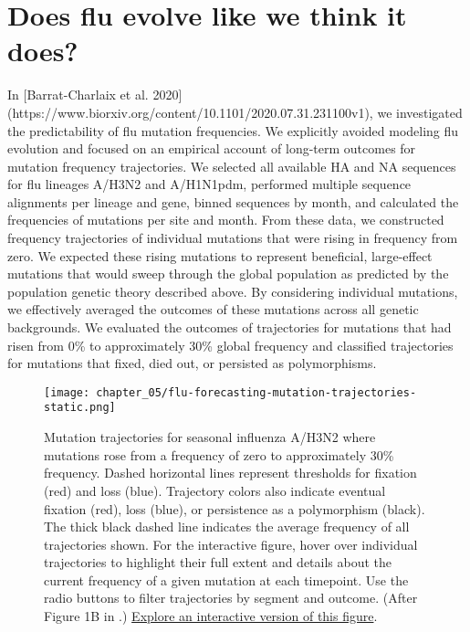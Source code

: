 \section{Does flu evolve like we think it does?}

In [Barrat-Charlaix et al. 2020](https://www.biorxiv.org/content/10.1101/2020.07.31.231100v1), we investigated the predictability of flu mutation frequencies.
We explicitly avoided modeling flu evolution and focused on an empirical account of long-term outcomes for mutation frequency trajectories.
We selected all available HA and NA sequences for flu lineages A/H3N2 and A/H1N1pdm, performed multiple sequence alignments per lineage and gene, binned sequences by month, and calculated the frequencies of mutations per site and month.
From these data, we constructed frequency trajectories of individual mutations that were rising in frequency from zero.
We expected these rising mutations to represent beneficial, large-effect mutations that would sweep through the global population as predicted by the population genetic theory described above.
By considering individual mutations, we effectively averaged the outcomes of these mutations across all genetic backgrounds.
We evaluated the outcomes of trajectories for mutations that had risen from 0\% to approximately 30\% global frequency and classified trajectories for mutations that fixed, died out, or persisted as polymorphisms.

\begin{figure}
  \centering
  \texttt{[image: chapter\_05/flu-forecasting-mutation-trajectories-static.png]}
  \caption{Mutation trajectories for seasonal influenza A/H3N2 where mutations rose from a frequency of zero to approximately 30\% frequency.
    Dashed horizontal lines represent thresholds for fixation (red) and loss (blue).
    Trajectory colors also indicate eventual fixation (red), loss (blue), or persistence as a polymorphism (black).
    The thick black dashed line indicates the average frequency of all trajectories shown.
    For the interactive figure, hover over individual trajectories to highlight their full extent and details about the current frequency of a given mutation at each timepoint.
    Use the radio buttons to filter trajectories by segment and outcome.
    (After Figure 1B in \citet{BarratCharlaix2020}.)
    \href{https://bedford.io/blog/predicting-seasonal-influenza-evolution/}{Explore an interactive version of this figure}.\label{fig:mutation-trajectories} }
\end{figure}

